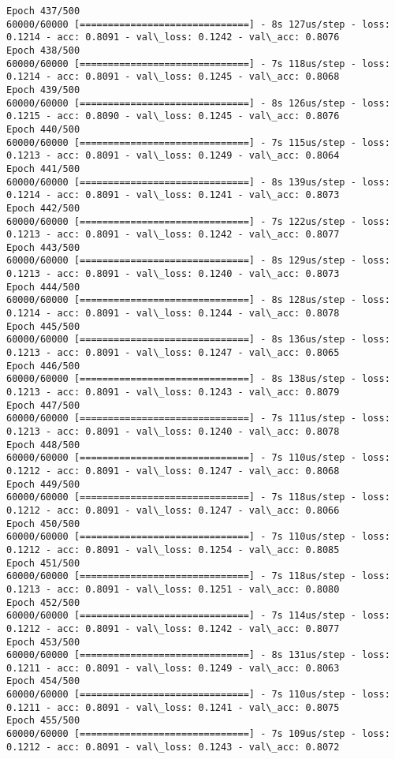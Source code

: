 \documentclass[11pt]{article}
\begin{document}
\begin{Verbatim}[commandchars=\\\{\}]
Epoch 437/500
60000/60000 [==============================] - 8s 127us/step - loss: 0.1214 - acc: 0.8091 - val\_loss: 0.1242 - val\_acc: 0.8076
Epoch 438/500
60000/60000 [==============================] - 7s 118us/step - loss: 0.1214 - acc: 0.8091 - val\_loss: 0.1245 - val\_acc: 0.8068
Epoch 439/500
60000/60000 [==============================] - 8s 126us/step - loss: 0.1215 - acc: 0.8090 - val\_loss: 0.1245 - val\_acc: 0.8076
Epoch 440/500
60000/60000 [==============================] - 7s 115us/step - loss: 0.1213 - acc: 0.8091 - val\_loss: 0.1249 - val\_acc: 0.8064
Epoch 441/500
60000/60000 [==============================] - 8s 139us/step - loss: 0.1214 - acc: 0.8091 - val\_loss: 0.1241 - val\_acc: 0.8073
Epoch 442/500
60000/60000 [==============================] - 7s 122us/step - loss: 0.1213 - acc: 0.8091 - val\_loss: 0.1242 - val\_acc: 0.8077
Epoch 443/500
60000/60000 [==============================] - 8s 129us/step - loss: 0.1213 - acc: 0.8091 - val\_loss: 0.1240 - val\_acc: 0.8073
Epoch 444/500
60000/60000 [==============================] - 8s 128us/step - loss: 0.1214 - acc: 0.8091 - val\_loss: 0.1244 - val\_acc: 0.8078
Epoch 445/500
60000/60000 [==============================] - 8s 136us/step - loss: 0.1213 - acc: 0.8091 - val\_loss: 0.1247 - val\_acc: 0.8065
Epoch 446/500
60000/60000 [==============================] - 8s 138us/step - loss: 0.1213 - acc: 0.8091 - val\_loss: 0.1243 - val\_acc: 0.8079
Epoch 447/500
60000/60000 [==============================] - 7s 111us/step - loss: 0.1213 - acc: 0.8091 - val\_loss: 0.1240 - val\_acc: 0.8078
Epoch 448/500
60000/60000 [==============================] - 7s 110us/step - loss: 0.1212 - acc: 0.8091 - val\_loss: 0.1247 - val\_acc: 0.8068
Epoch 449/500
60000/60000 [==============================] - 7s 118us/step - loss: 0.1212 - acc: 0.8091 - val\_loss: 0.1247 - val\_acc: 0.8066
Epoch 450/500
60000/60000 [==============================] - 7s 110us/step - loss: 0.1212 - acc: 0.8091 - val\_loss: 0.1254 - val\_acc: 0.8085
Epoch 451/500
60000/60000 [==============================] - 7s 118us/step - loss: 0.1213 - acc: 0.8091 - val\_loss: 0.1251 - val\_acc: 0.8080
Epoch 452/500
60000/60000 [==============================] - 7s 114us/step - loss: 0.1212 - acc: 0.8091 - val\_loss: 0.1242 - val\_acc: 0.8077
Epoch 453/500
60000/60000 [==============================] - 8s 131us/step - loss: 0.1211 - acc: 0.8091 - val\_loss: 0.1249 - val\_acc: 0.8063
Epoch 454/500
60000/60000 [==============================] - 7s 110us/step - loss: 0.1211 - acc: 0.8091 - val\_loss: 0.1241 - val\_acc: 0.8075
Epoch 455/500
60000/60000 [==============================] - 7s 109us/step - loss: 0.1212 - acc: 0.8091 - val\_loss: 0.1243 - val\_acc: 0.8072

\end{Verbatim}
\end{document}
